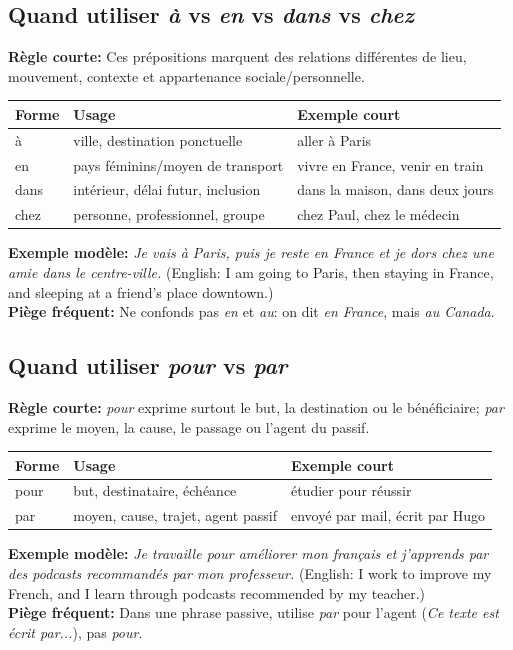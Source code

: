 \documentclass{article}
\begin{document}
\subsection{Quand utiliser \textit{à} vs \textit{en} vs \textit{dans} vs \textit{chez}}
\textbf{Règle courte:} Ces prépositions marquent des relations différentes de lieu, mouvement, contexte et appartenance sociale/personnelle.
\begin{center}
    \begin{tabular}{|l|l|l|}
        \hline
        \textbf{Forme} & \textbf{Usage} & \textbf{Exemple court} \\
        \hline
        à & ville, destination ponctuelle & aller à Paris \\
        \hline
        en & pays féminins/moyen de transport & vivre en France, venir en train \\
        \hline
        dans & intérieur, délai futur, inclusion & dans la maison, dans deux jours \\
        \hline
        chez & personne, professionnel, groupe & chez Paul, chez le médecin \\
        \hline
    \end{tabular}
\end{center}
\textbf{Exemple modèle:} \textit{Je vais à Paris, puis je reste en France et je dors chez une amie dans le centre-ville.} (English: I am going to Paris, then staying in France, and sleeping at a friend's place downtown.) \\
\textbf{Piège fréquent:} Ne confonds pas \textit{en} et \textit{au}: on dit \textit{en France}, mais \textit{au Canada}.

\subsection{Quand utiliser \textit{pour} vs \textit{par}}
\textbf{Règle courte:} \textit{pour} exprime surtout le but, la destination ou le bénéficiaire; \textit{par} exprime le moyen, la cause, le passage ou l'agent du passif.
\begin{center}
    \begin{tabular}{|l|l|l|}
        \hline
        \textbf{Forme} & \textbf{Usage} & \textbf{Exemple court} \\
        \hline
        pour & but, destinataire, échéance & étudier pour réussir \\
        \hline
        par & moyen, cause, trajet, agent passif & envoyé par mail, écrit par Hugo \\
        \hline
    \end{tabular}
\end{center}
\textbf{Exemple modèle:} \textit{Je travaille pour améliorer mon français et j'apprends par des podcasts recommandés par mon professeur.} (English: I work to improve my French, and I learn through podcasts recommended by my teacher.) \\
\textbf{Piège fréquent:} Dans une phrase passive, utilise \textit{par} pour l'agent (\textit{Ce texte est écrit par...}), pas \textit{pour}.
\end{document}
